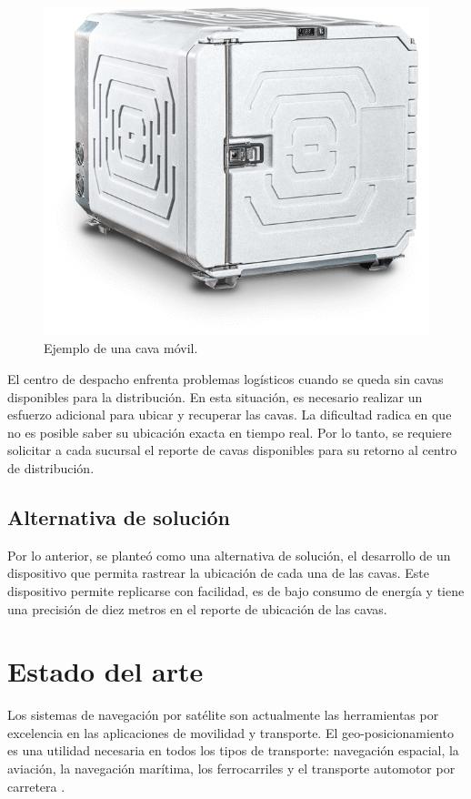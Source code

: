 \vspace{1cm}

\begin{figure}[htbp]
	\centering
	\includegraphics[width=.5\textwidth]{./Figures/cava.png}
	\caption{Ejemplo de una cava móvil\protect\footnotemark.}
	\label{fig:cava}
\end{figure}

El centro de despacho enfrenta problemas logísticos cuando se queda sin cavas disponibles para la distribución. En esta situación, es necesario realizar un esfuerzo adicional para ubicar y recuperar las cavas. La dificultad radica en que no es posible saber su ubicación exacta en tiempo real. Por lo tanto, se requiere solicitar a cada sucursal el reporte de cavas disponibles para su retorno al centro de distribución.

\subsection{Alternativa de solución}

Por lo anterior, se planteó como una alternativa de solución, el desarrollo de un dispositivo que permita rastrear la ubicación de cada una de las cavas. Este dispositivo permite replicarse con facilidad, es de bajo consumo de energía y tiene una precisión de diez metros en el reporte de ubicación de las cavas. 



\section{Estado del arte}
\label{sec:estado_del_arte}

Los sistemas de navegación por satélite son actualmente las herramientas por excelencia en las aplicaciones de movilidad y transporte. El geo-posicionamiento es una utilidad necesaria en todos los tipos de transporte: navegación espacial, la aviación, la navegación marítima, los ferrocarriles y el transporte automotor por carretera \citep{GNSS-Junta-Adalucia}.

